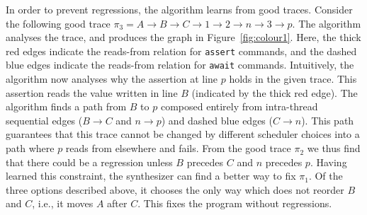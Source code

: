 \documentclass{llncs}
\newcommand\trace{\pi}
\begin{document}
In order to prevent regressions, the algorithm learns from good
traces. 
Consider the following good trace $\trace_3 = A \to  B \to  C \to  1 \to 
2 \to  n \to  3 \to  p$.
The algorithm analyses the trace, and produces the graph in 
Figure~\ref{fig:colour1}. 
Here, the thick red edges indicate the reads-from
relation for {\tt assert} commands, and the dashed blue edges indicate
the reads-from relation for {\tt await} commands. 
Intuitively, the algorithm now analyses why the assertion at line $p$
holds in the given trace. 
This assertion reads the value written in line $B$ (indicated by the
thick red edge).
The algorithm finds a path from $B$ to $p$ composed entirely from
intra-thread sequential edges ($B \to C$ and $n \to p$) and dashed blue
edges ($C \to n$).
This path guarantees that this trace cannot be changed by different
scheduler choices into a path where $p$ reads from elsewhere and fails. 
From the good trace $\trace_2$ we thus find that there could be a
regression unless $B$ precedes $C$ and $n$ precedes $p$. 
Having learned this constraint, the synthesizer can find a better way
to fix $\trace_1$. 
Of the three options described above, it chooses the only way which does not
reorder $B$ and $C$, i.e., it moves $A$ after $C$. 
This fixes the program without regressions.
\end{document}
